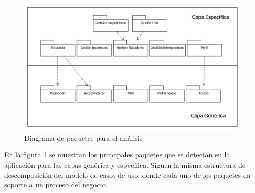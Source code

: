 		\begin{figure}[H]
		  \centering
		    \includegraphics[width=14cm]{./eps/an_diagpaquetes/an_diagpaquetes.eps}
		  \caption{Diagrama de paquetes para el análisis}
		  \label{fig:an_diagpaquetes}
		\end{figure}
		
		En la figura \ref{fig:an_diagpaquetes} se muestran los principales paquetes que se detectan en la aplicación para las capas genérica y específica. Siguen la misma estructura de descomposición del modelo de casos de uso, donde cada uno de los paquetes da soporte a un proceso del negocio.

